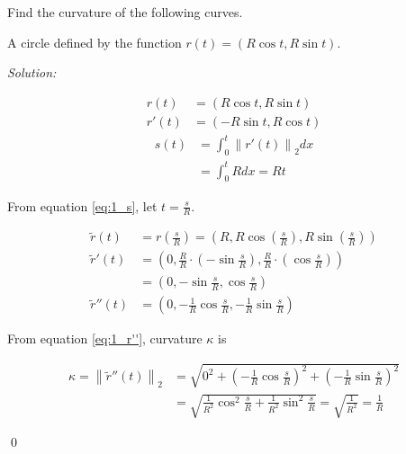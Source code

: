 \documentclass[12pt]{article}
\newenvironment{problem}[2][Problem]{\begin{trivlist}
\item[\hskip \labelsep {\bfseries #1}\hskip \labelsep {\bfseries #2.}]}{\end{trivlist}}
\newenvironment{sol}
{\emph{Solution:}
}
{
    \qed
    }
\begin{document}




Find the curvature of the following curves.
\begin{problem}{1} 
    A circle defined by the function $r(t)=(R \cos t, R \sin t)$.
    \begin{center}
    \end{center}
\end{problem}

\begin{sol}
    \begin{align}
        r(t)  &= (R \cos{t}, R \sin{t}) \nonumber \\
        r'(t) &= (-R \sin{t}, R \cos{t}) \nonumber
    \end{align}
    \begin{align}
        s(t) &= \int_0^t \left\lVert r'(t) \right\rVert_2 dx \nonumber \\
             &= \int_0^t R dx = Rt \label{eq:1_s} 
    \end{align}

    From equation \ref{eq:1_s}, let $t=\frac{s}{R}$.
    
    \begin{align}
        \tilde{r}(t)   &= r \left(\frac{s}{R} \right) = \left(R, R \cos\left(\frac{s}{R}\right), R \sin\left(\frac{s}{R}\right)\right) \nonumber \\
        \tilde{r}'(t)  &= \left( 0, \frac{R}{R} \cdot \left(-\sin\frac{s}{R}\right),\frac{R}{R} \cdot \left(\cos\frac{s}{R}\right) \right) \nonumber \\
                       &= \left( 0, -\sin\frac{s}{R}, \cos\frac{s}{R} \right) \nonumber \\
        \tilde{r}''(t) &= \left( 0, -\frac{1}{R} \cos\frac{s}{R}, -\frac{1}{R} \sin\frac{s}{R} \right) \label{eq:1_r''}
    \end{align}

    From equation \ref{eq:1_r''}, curvature $\kappa$ is

    \begin{align}
        \kappa = \left\lVert \tilde{r}''(t) \right\rVert_2 &= \sqrt{0^2 + \left( -\frac{1}{R} \cos\frac{s}{R} \right)^2 + \left( -\frac{1}{R} \sin\frac{s}{R} \right)^2} \nonumber\\
                                                           &= \sqrt{\frac{1}{R^2} \cos^2\frac{s}{R} + \frac{1}{R^2} \sin^2\frac{s}{R}} = \sqrt{\frac{1}{R^2}} = \frac{1}{R} \nonumber
    \end{align}
\end{sol}
\end{document}
